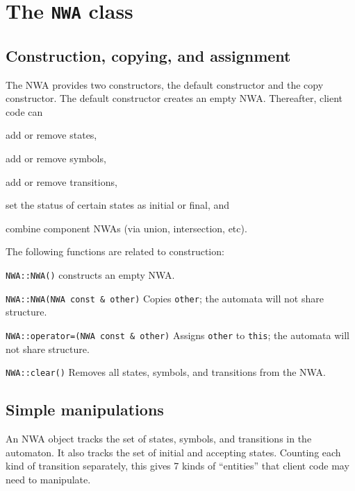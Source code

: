 \section{The \texttt{NWA} class}
\label{Se:NWA-class}

\subsection{Construction, copying, and assignment}
\label{Se:Construction}

The NWA provides two constructors, the default constructor and the copy
constructor. The default constructor creates an empty NWA. Thereafter, 
client code can \begin{inparaenum} \item add or remove states, \item add or remove
symbols, \item add or remove transitions, \item set the status of certain
  states as initial or final, and \item combine component NWAs (via union,
  intersection, etc). \end{inparaenum}


The following functions are related to construction:
\begin{description}
  \item \texttt{NWA::NWA()} constructs an empty NWA.

  \item \texttt{NWA::NWA(NWA const \& other)} Copies \texttt{other}; the
    automata will not share structure.

  \item \texttt{NWA::operator=(NWA const \& other)} Assigns \texttt{other} to \texttt{this};
    the automata will not share structure.

  \item \texttt{NWA::clear()} \nopagebreak
    Removes all states, symbols, and transitions from the NWA.

\end{description}


\subsection{Simple manipulations}

An NWA object tracks the set of states, symbols, and transitions in the
automaton. It also tracks the set of initial and accepting states.
Counting each kind of transition separately, this gives 7 kinds of
``entities'' that client code may need to manipulate.


